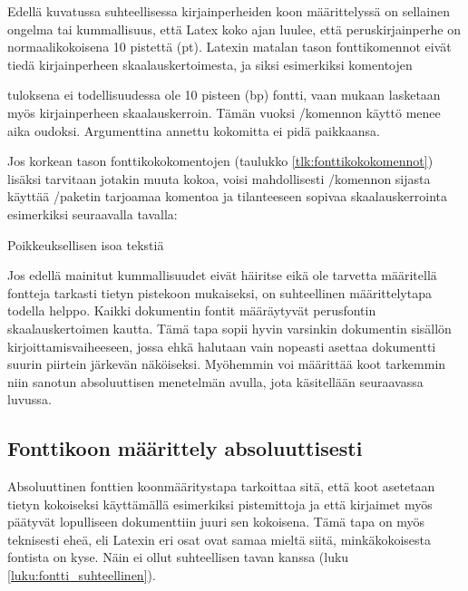 Edellä kuvatussa suhteellisessa kirjainperheiden koon määrittelyssä on
sellainen ongelma tai kummallisuus, että Latex koko ajan luulee, että
peruskirjainperhe on normaalikokoisena 10 pistettä (pt). Latexin matalan
tason fonttikomennot eivät tiedä kirjainperheen skaalauskertoimesta, ja
siksi esimerkiksi komentojen

\begin{koodilohkosis}
  \fontsize{10bp}{12bp} \selectfont
\end{koodilohkosis}

tuloksena ei todellisuudessa ole 10 pisteen (bp) fontti, vaan mukaan
lasketaan myös kirjainperheen skaalauskerroin. Tämän vuoksi \-/komennon käyttö menee aika oudoksi. Argumenttina annettu
kokomitta ei pidä paikkaansa.

Jos korkean tason font\-ti\-koko\-komen\-to\-jen (taulukko
\ref{tlk:fonttikokokomennot}) lisäksi tarvitaan jotakin muuta kokoa,
voisi mahdollisesti \-/komennon sijasta käyttää
\-/paketin tarjoamaa komentoa ja tilanteeseen sopivaa
skaalauskerrointa esimerkiksi seuraavalla tavalla:

\begin{koodilohkosis}
  { Poikkeuksellisen isoa tekstiä}
\end{koodilohkosis}

Jos edellä mainitut kummallisuudet eivät häiritse eikä ole tarvetta
määritellä fontteja tarkasti tietyn pistekoon mukaiseksi, on
suhteellinen määrittelytapa todella helppo. Kaikki dokumentin fontit
määräytyvät perusfontin skaalauskertoimen kautta. Tämä tapa sopii hyvin
varsinkin dokumentin sisällön kirjoittamisvaiheeseen, jossa ehkä
halutaan vain nopeasti asettaa dokumentti suurin piirtein järkevän
näköiseksi. Myöhemmin voi määrittää koot tarkemmin niin sanotun
absoluuttisen menetelmän avulla, jota käsitellään seuraavassa luvussa.

\subsection{Fonttikoon määrittely absoluuttisesti}
\label{luku:fontti_absoluuttinen}

Absoluuttinen fonttien koonmääritystapa tarkoittaa sitä, että koot
asetetaan tietyn kokoiseksi käyttämällä esimerkiksi pistemittoja ja että
kirjaimet myös päätyvät lopulliseen dokumenttiin juuri sen kokoisena.
Tämä tapa on myös teknisesti eheä, eli Latexin eri osat ovat samaa
mieltä siitä, minkäkokoisesta fontista on kyse. Näin ei ollut
suhteellisen tavan kanssa (luku \ref{luku:fontti_suhteellinen}).

